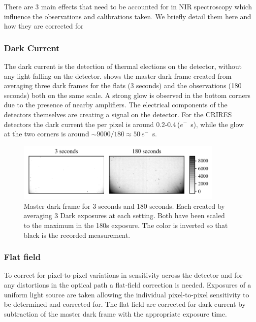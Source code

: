 There are 3 main effects that need to be accounted for in NIR spectroscopy which influence the observations and calibrations taken. We briefly detail them here and how they are corrected for

\subsubsection{Dark Current}
The dark current is the detection of thermal elections on the detector, without any light falling on the detector.  shows the master dark frame created from averaging three dark frames for the flats (3 seconds) and the observations (180 seconds) both on the same scale. A strong glow is observed in the bottom corners due to the presence of nearby amplifiers. The electrical components of the detectors themselves are creating a signal on the detector.
For the CRIRES detectors the dark current the per pixel is around 0.2-0.4\,(\(e^{-}\)\si{\per\second}), while the glow at the two corners is around \(\sim9000 / 180\approx50\)\,\(e^{-}\)\si{\per\second}.


\begin{figure}[h]
\centering
\includegraphics[width=0.9\textwidth]{figures/reduction/master_darks_1.pdf}
\caption{Master dark frame for 3 seconds and 180 seconds. Each created by averaging 3 Dark exposures at each setting. Both have been scaled to the maximum in the 180s exposure. The color is inverted so that black is the recorded measurement.}
\label{fig:dark_current}
\end{figure}


\subsubsection{Flat field}
To correct for pixel-to-pixel variations in sensitivity across the detector and for any distortions in the optical path a flat-field correction is needed. Exposures of a uniform light source are taken allowing the individual pixel-to-pixel sensitivity to be determined and corrected for. The flat field are corrected for dark current by subtraction of the master dark frame with the appropriate exposure time.

